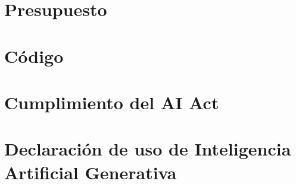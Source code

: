 \documentclass[12pt]{report} %
\renewcommand{\_}{\origunderscore\allowbreak}
\begin{document}


\clearpage
{}

\printbibliography



\appendix
\chapter{Presupuesto}
\label{appendix_budget}


\chapter{Código}
\label{appendix_code}


\chapter{Cumplimiento del AI Act}
\label{appendix_ai_act}


\chapter{Declaración de uso de Inteligencia Artificial Generativa}
\label{appendix_iag}

\end{document}
